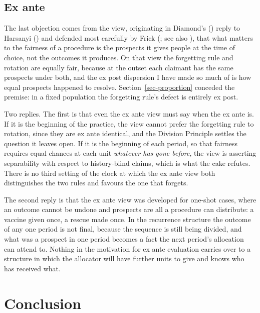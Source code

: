 \documentclass[
  11pt,
  letterpaper,
  DIV=11,
  numbers=noendperiod,
  twoside]{scrartcl}
\begin{document}
\subsection{Ex ante}\label{sec-exante}

The last objection comes from the view, originating in Diamond's
() reply to Harsanyi
() and defended most carefully by Frick
(; see also
), that
what matters to the fairness of a procedure is the prospects it gives
people at the time of choice, not the outcomes it produces. On that view
the forgetting rule and rotation are equally fair, because at the outset
each claimant has the same prospects under both, and the ex post
dispersion I have made so much of is how equal prospects happened to
resolve. Section~\ref{sec-proportion} conceded the premise: in a fixed
population the forgetting rule's defect is entirely ex post.

Two replies. The first is that even the ex ante view must say when the
ex ante is. If it is the beginning of the practice, the view cannot
prefer the forgetting rule to rotation, since they are ex ante
identical, and the Division Principle settles the question it leaves
open. If it is the beginning of each period, so that fairness requires
equal chances at each unit \emph{whatever has gone before}, the view is
asserting separability with respect to history-blind claims, which is
what the cake refutes. There is no third setting of the clock at which
the ex ante view both distinguishes the two rules and favours the one
that forgets.

The second reply is that the ex ante view was developed for one-shot
cases, where an outcome cannot be undone and prospects are all a
procedure can distribute: a vaccine given once, a rescue made once. In
the recurrence structure the outcome of any one period is not final,
because the sequence is still being divided, and what was a prospect in
one period becomes a fact the next period's allocation can attend to.
Nothing in the motivation for ex ante evaluation carries over to a
structure in which the allocator will have further units to give and
knows who has received what.

\section{Conclusion}\label{sec-conclusion}
\end{document}
